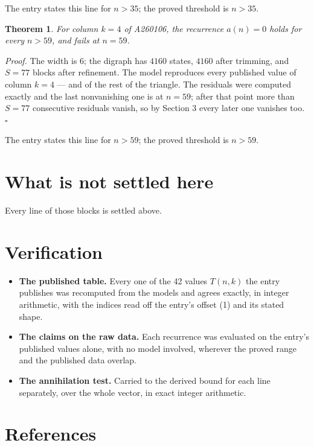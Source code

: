 \documentclass[11pt]{article}
\newtheorem{theorem}{Theorem}
\theoremstyle{definition}
\begin{document}
The entry states this line for $n > 35$; the proved threshold is $n > 35$.

\begin{theorem} For column $k = 4$ of A260106, the recurrence $a(n) = 0$ holds for every $n > 59$, and fails at $n = 59$.\end{theorem}

{\itshape Proof.} The width is $6$; the digraph has $4160$ states, $4160$ after trimming, and $S = 77$ blocks after refinement. The model reproduces every published value of column $k = 4$ --- and of the rest of the triangle. The residuals were computed exactly and the last nonvanishing one is at $n = 59$; after that point more than $S = 77$ consecutive residuals vanish, so by Section 3 every later one vanishes too. $\square$

The entry states this line for $n > 59$; the proved threshold is $n > 59$.

\section{What is not settled here}

Every line of those blocks is settled above.

\section{Verification}

\begin{itemize}

\item {\bfseries The published table.} Every one of the 42 values $T(n,k)$ the entry publishes was recomputed from the models and agrees exactly, in integer arithmetic, with the indices read off the entry's offset (1) and its stated shape.

\item {\bfseries The claims on the raw data.} Each recurrence was evaluated on the entry's published values alone, with no model involved, wherever the proved range and the published data overlap.

\item {\bfseries The annihilation test.} Carried to the derived bound for each line separately, over the whole vector, in exact integer arithmetic.

\end{itemize}

\section{References}
\end{document}
